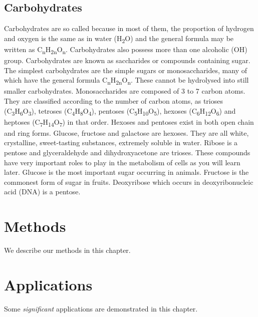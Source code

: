 \documentclass[
]{book}
\begin{document}
\hypertarget{carbohydrates}{%
\section{Carbohydrates}\label{carbohydrates}}

Carbohydrates are so called because in most of them, the proportion of hydrogen and oxygen is the same as in water (H\textsubscript{2}O) and the general formula may be written as C\textsubscript{n}H\textsubscript{2n}O\textsubscript{n}. Carbohydrates also possess more than one alcoholic (OH) group.
Carbohydrates are known as saccharides or compounds containing sugar. The simplest carbohydrates are the simple sugars or monosaccharides, many of which have the general formula C\textsubscript{n}H\textsubscript{2n}O\textsubscript{n}. These cannot be hydrolysed into still smaller carbohydrates. Monosaccharides are composed of 3 to 7 carbon atoms. They are classified according to the number of carbon atoms, as trioses (C\textsubscript{3}H\textsubscript{6}O\textsubscript{3}), tetroses (C\textsubscript{4}H\textsubscript{8}O\textsubscript{4}), pentoses (C\textsubscript{5}H\textsubscript{10}O\textsubscript{5}), hexoses (C\textsubscript{6}H\textsubscript{12}O\textsubscript{6}) and heptoses (C\textsubscript{7}H\textsubscript{14}O\textsubscript{7}) in that order. Hexoses and pentoses exist in both open chain and ring forms. Glucose, fructose and galactose are hexoses. They are all white, crystalline, sweet-tasting substances, extremely soluble in water. Ribose is a pentose and glyceraldehyde and dihydroxyacetone are trioses. These compounds have very important roles to play in the metabolism of cells as you will learn later. Glucose is the most important sugar occurring in animals. Fructose is the commonest form of sugar in fruits. Deoxyribose which occurs in deoxyribonucleic acid (DNA) is a pentose.

\hypertarget{methods}{%
\chapter{Methods}\label{methods}}

We describe our methods in this chapter.

\hypertarget{applications}{%
\chapter{Applications}\label{applications}}

Some \emph{significant} applications are demonstrated in this chapter.
\end{document}
